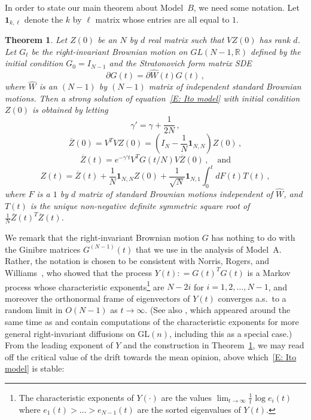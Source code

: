 \documentclass[12pt]{article}
\newtheorem{theorem}{Theorem}
\newcommand{\1}{\mathbf{1}}
\begin{document}
In order to state our main theorem about Model~$B$, we need some notation.  Let $\mathbf{1}_{k,\ell}$ denote the $k$ by $\ell$ matrix whose entries are all equal to $1$.
\begin{theorem}\label{T: continuous time solution} Let $Z(0)$ be an $N$ by $d$ real matrix such that $V Z(0)$ has rank $d$. Let $G_t$ be the right-invariant Brownian motion on $GL(N-1,\mathbb{R})$ defined by the initial condition $G_0 = I_{N-1}$ and the  Stratonovich form matrix SDE
\begin{equation} \label{E: H def} 
\partial G(t) = \partial \hat{W}(t) G(t)\,,
\end{equation}
where $\hat{W}$ is an $(N-1)$ by $(N-1)$ matrix of independent standard Brownian motions. Then a strong solution of equation~\eqref{E: Ito model} with initial condition $Z(0)$ is obtained by letting
$$ \gamma' = \gamma + \frac{1}{2N}\,,$$
$$ \overline{Z}(0) = V^TVZ(0) = \left(I_N - \frac{1}{N}\mathbf{1}_{N,N}\right)Z(0)\,,$$
$$ \overline{Z}(t) = e^{-\gamma' t} V^T G(t/N) V \overline{Z}(0)\,, \quad \text{and}$$
$$ Z(t) = \overline{Z}(t) +  \frac{1}{N}\mathbf{1}_{N,N}Z(0) + \frac{1}{\sqrt{N}} \mathbf{1}_{N,1} \int_0^t dF(t) T(t) \,,$$
where $F$ is a $1$ by $d$ matrix of standard Brownian motions independent of $\hat{W}$, and $T(t)$ is the unique non-negative definite symmetric square root of $\frac{1}{N} \overline{Z}(t)^T\overline{Z}(t)$.
\end{theorem}
We remark that the right-invariant Brownian motion $G$ has nothing to do with the Ginibre matrices $G^{(N-1)}(t)$ that we use in the analysis of Model~A. Rather, the notation is chosen to be consistent with
Norris, Rogers, and Williams~\cite{NRW}, who showed that the  process $Y(t) : = G(t)^T G(t)$ is a Markov process whose characteristic exponents\footnote{The characteristic exponents of $Y(\cdot)$ are the values $\lim_{t \to \infty} \frac{1}{t} \log e_i(t)$ where $e_1(t) > \dots > e_{N-1}(t)$ are the sorted eigenvalues of $Y(t)$.} are $N - 2i$ for $i = 1,2, \dots, N-1$, and moreover the orthonormal frame of eigenvectors of $Y(t)$ converges a.s.~to a random limit in $O(N-1)$ as $t \to \infty$.  (See also \cite{Newman, LeJan}, which appeared around the same time as \cite{NRW} and contain computations of the characteristic exponents for more general right-invariant diffusions on $\mathrm{GL}(n)$, including this as a special case.) From the leading exponent of $Y$ and the construction in Theorem~\ref{T: continuous time solution}, we may read off the critical value of the drift towards the mean opinion, above which~\eqref{E: Ito model} is stable: 
\end{document}

